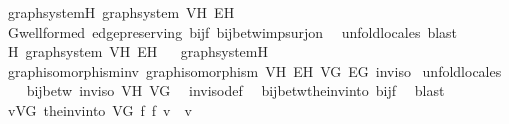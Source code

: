\begin{isabellebody}
\isanewline
{}\isamarkupfalse%
\ graph{\isacharunderscore}{\kern0pt}system{\isacharunderscore}{\kern0pt}H{\isacharcolon}{\kern0pt}\ {\isachardoublequoteopen}graph{\isacharunderscore}{\kern0pt}system\ V\isactrlsub H\ E\isactrlsub H{\isachardoublequoteclose}\isanewline
%
\isadelimproof
\ \ %
\endisadelimproof
%
\isatagproof
{}\isamarkupfalse%
\ G{\isachardot}{\kern0pt}wellformed\ edge{\isacharunderscore}{\kern0pt}preserving\ bij{\isacharunderscore}{\kern0pt}f\ bij{\isacharunderscore}{\kern0pt}betw{\isacharunderscore}{\kern0pt}imp{\isacharunderscore}{\kern0pt}surj{\isacharunderscore}{\kern0pt}on\ \isamarkupfalse%
\ unfold{\isacharunderscore}{\kern0pt}locales\ blast%
\endisatagproof
{\isafoldproof}%
%
\isadelimproof
\isanewline
%
\endisadelimproof
\isanewline
{}\isamarkupfalse%
\ H{\isacharcolon}{\kern0pt}\ graph{\isacharunderscore}{\kern0pt}system\ V\isactrlsub H\ E\isactrlsub H%
\isadelimproof
\ %
\endisadelimproof
%
\isatagproof
{}\isamarkupfalse%
\ graph{\isacharunderscore}{\kern0pt}system{\isacharunderscore}{\kern0pt}H\ \isacommand{{\isachardot}{\kern0pt}}\isamarkupfalse%
%
\endisatagproof
{\isafoldproof}%
%
\isadelimproof
%
\endisadelimproof
\isanewline
\isanewline
{}\isamarkupfalse%
\ graph{\isacharunderscore}{\kern0pt}isomorphism{\isacharunderscore}{\kern0pt}inv{\isacharcolon}{\kern0pt}\ {\isachardoublequoteopen}graph{\isacharunderscore}{\kern0pt}isomorphism\ V\isactrlsub H\ E\isactrlsub H\ V\isactrlsub G\ E\isactrlsub G\ inv{\isacharunderscore}{\kern0pt}iso{\isachardoublequoteclose}\isanewline
%
\isadelimproof
%
\endisadelimproof
%
\isatagproof
{}\isamarkupfalse%
\ {\isacharparenleft}{\kern0pt}unfold{\isacharunderscore}{\kern0pt}locales{\isacharparenright}{\kern0pt}\isanewline
\ \ \isamarkupfalse%
\ {\isachardoublequoteopen}bij{\isacharunderscore}{\kern0pt}betw\ inv{\isacharunderscore}{\kern0pt}iso\ V\isactrlsub H\ V\isactrlsub G{\isachardoublequoteclose}\ \isamarkupfalse%
\ inv{\isacharunderscore}{\kern0pt}iso{\isacharunderscore}{\kern0pt}def\ \isamarkupfalse%
\ bij{\isacharunderscore}{\kern0pt}betw{\isacharunderscore}{\kern0pt}the{\isacharunderscore}{\kern0pt}inv{\isacharunderscore}{\kern0pt}into\ bij{\isacharunderscore}{\kern0pt}f\ \isamarkupfalse%
\ blast\isanewline
{}\isamarkupfalse%
\isanewline
\ \ \isamarkupfalse%
\ {\isachardoublequoteopen}{\isasymforall}v{\isasymin}V\isactrlsub G{\isachardot}{\kern0pt}\ the{\isacharunderscore}{\kern0pt}inv{\isacharunderscore}{\kern0pt}into\ V\isactrlsub G\ f\ {\isacharparenleft}{\kern0pt}f\ v{\isacharparenright}{\kern0pt}\ {\isacharequal}{\kern0pt}\ v{\isachardoublequoteclose}\ \isamarkupfalse%

\end{isabellebody}
